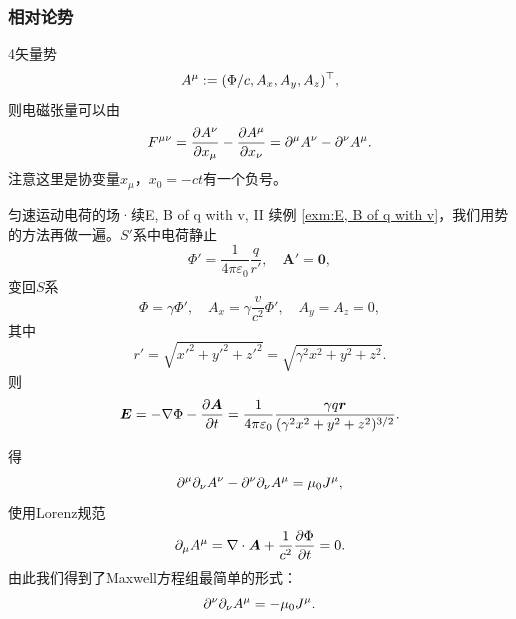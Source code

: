 \subsubsection{相对论势}
4矢量势
\begin{equation}
    A^\mu:=(\Phi/c,A_x,A_y,A_z)^\top,
\end{equation}
则电磁张量可以由
\begin{equation}
    F^{\mu\nu}=\frac{\partial A^\nu}{\partial x_\mu}-\frac{\partial A^\mu}{\partial x_\nu}=\partial^\mu A^\nu-\partial^\nu A^\mu.
\end{equation}
注意这里是协变量$x_\mu$，$x_0=-ct$有一个负号。
\begin{example}{匀速运动电荷的场·续}{E, B of q with v, II}
    续例 \ref{exm:E, B of q with v}，我们用势的方法再做一遍。$S'$系中电荷静止 
    \[
        \Phi'=\frac1{4\pi\varepsilon_0}\frac q{r'},\quad\bm A'=\bm 0,
    \]
    变回$S$系
    \[
        \Phi=\gamma\Phi',\quad A_x=\gamma\frac v{c^2}\Phi',\quad A_y=A_z=0,
    \]
    其中 
    \[
        r'=\sqrt{x'^2+y'^2+z'^2}=\sqrt{\gamma^2x^2+y^2+z^2}.
    \]
    则
    \[
        \bm E=-\nabla\Phi-\frac{\partial^{\;\!\!}\bm A}{\partial t^{\;\!\!}}=\frac1{4\pi\varepsilon_0}\frac{\gamma q\bm r}{(\gamma^2x^2+y^2+z^2)^{3/2}}.
    \]
\end{example}
得
\[
    \partial^\mu\partial_\nu A^\nu-\partial^\nu\partial_\nu A^\mu=\mu_0J^\mu,
\]
使用Lorenz规范
\[
    \partial_\mu A^\mu=\nabla\cdot\bm A+\frac1{c^2}\frac{\partial^{\;\!\!}\Phi}{\partial t^{\;\!\!}}=0.
\]
由此我们得到了Maxwell方程组最简单的形式：
\begin{equation}
    \partial^\nu\partial_\nu A^\mu=-\mu_0J^\mu.
\end{equation}

